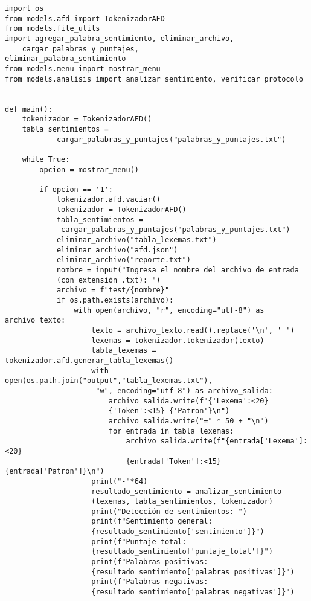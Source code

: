 \documentclass[12pt,a4paper]{article}
\begin{document}
\begin{verbatim}
import os
from models.afd import TokenizadorAFD
from models.file_utils 
import agregar_palabra_sentimiento, eliminar_archivo,
    cargar_palabras_y_puntajes, 
eliminar_palabra_sentimiento
from models.menu import mostrar_menu
from models.analisis import analizar_sentimiento, verificar_protocolo


def main():
    tokenizador = TokenizadorAFD()
    tabla_sentimientos = 
            cargar_palabras_y_puntajes("palabras_y_puntajes.txt")

    while True:
        opcion = mostrar_menu()

        if opcion == '1':
            tokenizador.afd.vaciar() 
            tokenizador = TokenizadorAFD()
            tabla_sentimientos =
             cargar_palabras_y_puntajes("palabras_y_puntajes.txt")
            eliminar_archivo("tabla_lexemas.txt")
            eliminar_archivo("afd.json")
            eliminar_archivo("reporte.txt")
            nombre = input("Ingresa el nombre del archivo de entrada 
            (con extensión .txt): ")
            archivo = f"test/{nombre}"
            if os.path.exists(archivo):
                with open(archivo, "r", encoding="utf-8") as archivo_texto:
                    texto = archivo_texto.read().replace('\n', ' ')                    
                    lexemas = tokenizador.tokenizador(texto)
                    tabla_lexemas = tokenizador.afd.generar_tabla_lexemas()
                    with open(os.path.join("output","tabla_lexemas.txt"),
                     "w", encoding="utf-8") as archivo_salida:
                        archivo_salida.write(f"{'Lexema':<20} 
                        {'Token':<15} {'Patron'}\n")
                        archivo_salida.write("=" * 50 + "\n")
                        for entrada in tabla_lexemas:
                            archivo_salida.write(f"{entrada['Lexema']:<20} 
                            {entrada['Token']:<15} {entrada['Patron']}\n")
                    print("-"*64)
                    resultado_sentimiento = analizar_sentimiento
                    (lexemas, tabla_sentimientos, tokenizador)
                    print("Detección de sentimientos: ")
                    print(f"Sentimiento general: 
                    {resultado_sentimiento['sentimiento']}")
                    print(f"Puntaje total: 
                    {resultado_sentimiento['puntaje_total']}")
                    print(f"Palabras positivas: 
                    {resultado_sentimiento['palabras_positivas']}")
                    print(f"Palabras negativas: 
                    {resultado_sentimiento['palabras_negativas']}")


\end{verbatim}
\end{document}
